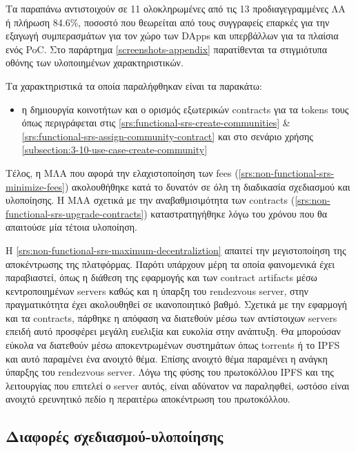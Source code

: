 Τα παραπάνω αντιστοιχούν σε 11 ολοκληρωμένες από τις 13 προδιαγεγραμμένες ΛΑ ή πλήρωση 84.6\%, ποσοστό που θεωρείται από τους συγγραφείς επαρκές για την εξαγωγή συμπερασμάτων για τον χώρο των DApps και υπερβάλλων για τα πλαίσια ενός PoC. Στο παράρτημα \ref{screenshots-appendix} παρατίθενται τα στιγμιότυπα οθόνης των υλοποιημένων χαρακτηριστικών.

Τα χαρακτηριστικά τα οποία παραλήφθηκαν είναι τα παρακάτω:

\begin{itemize}
    \item η δημιουργία κοινοτήτων και ο ορισμός εξωτερικών contracts για τα tokens τους όπως περιγράφεται στις \ref{srs:functional-srs-create-communities} \& \ref{srs:functional-srs-assign-community-contract} και στο σενάριο χρήσης \ref{subsection:3-10-use-case-create-community}
\end{itemize}

Τέλος, η ΜΛΑ που αφορά την ελαχιστοποίηση των fees (\ref{srs:non-functional-srs-minimize-fees}) ακολουθήθηκε κατά το δυνατόν σε όλη τη διαδικασία σχεδιασμού και υλοποίησης. Η ΜΛΑ σχετικά με την αναβαθμισιμότητα των contracts (\ref{srs:non-functional-srs-upgrade-contracts}) καταστρατηγήθηκε λόγω του χρόνου που θα απαιτούσε μία τέτοια υλοποίηση.

Η \ref{srs:non-functional-srs-maximum-decentraliztion} απαιτεί την μεγιστοποίηση της αποκέντρωσης της πλατφόρμας. Παρότι υπάρχουν μέρη τα οποία φαινομενικά έχει παραβιαστεί, όπως η διάθεση της εφαρμογής και των contract artifacts μέσω κεντροποιημένων servers καθώς και η ύπαρξη του rendezvous server, στην πραγματικότητα έχει ακολουθηθεί σε ικανοποιητικό βαθμό. Σχετικά με την εφαρμογή και τα contracts, πάρθηκε η απόφαση να διατεθούν μέσω των αντίστοιχων servers επειδή αυτό προσφέρει μεγάλη ευελιξία και ευκολία στην ανάπτυξη. Θα μπορούσαν εύκολα να διατεθούν μέσω αποκεντρωμένων συστημάτων όπως torrents ή το IPFS και αυτό παραμένει ένα ανοιχτό θέμα. Επίσης ανοιχτό θέμα παραμένει η ανάγκη ύπαρξης του rendezvous server. Λόγω της φύσης του πρωτοκόλλου IPFS και της λειτουργίας που επιτελεί ο server αυτός, είναι αδύνατον να παραληφθεί, ωστόσο είναι ανοιχτό ερευνητικό πεδίο η περαιτέρω αποκέντρωση του πρωτοκόλλου.

\subsection{Διαφορές σχεδιασμού-υλοποίησης} \label{subsection:4-6-1-design-implementation-differences}

